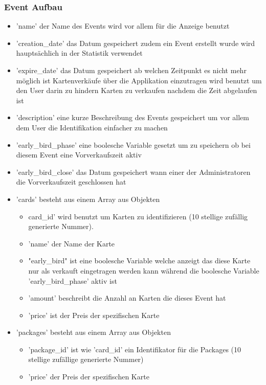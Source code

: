 			\subsubsection{Event Aufbau}			
				\begin{itemize}
					\item 'name' der Name des Events wird vor allem für die Anzeige benutzt
					\item 'creation\_date' das Datum gespeichert zudem ein Event erstellt wurde wird hauptsächlich in der Statistik verwendet
					\item 'expire\_date' das Datum gespeichert ab welchen Zeitpunkt es nicht mehr möglich ist Kartenverkäufe über die Applikation einzutragen wird benutzt um den User darin zu hindern Karten zu verkaufen nachdem die Zeit abgelaufen ist
					\item 'description' eine kurze Beschreibung des Events gespeichert um vor allem dem User die Identifikation einfacher zu machen
					\item 'early\_bird\_phase' eine boolesche Variable gesetzt um zu speichern ob bei diesem Event eine Vorverkaufszeit aktiv
					\item 'early\_bird\_close' das Datum gespeichert wann einer der Administratoren die Vorverkaufszeit geschlossen hat
					\item 'cards' besteht aus einem Array aus Objekten
					\begin{itemize}
						\item card\_id' wird benutzt um Karten zu identifizieren (10 stellige zufällig generierte Nummer). 
						\item 'name' der Name der Karte
						\item "early\_bird" ist eine boolesche Variable welche anzeigt das diese Karte nur als verkauft eingetragen werden kann während die boolesche Variable 'early\_bird\_phase' aktiv ist
						\item 'amount' beschreibt die Anzahl an Karten die dieses Event hat
						\item 'price' ist der Preis der spezifischen Karte
					\end{itemize}
					\item 'packages' besteht aus einem Array aus Objekten
					\begin{itemize}
						\item 'package\_id' ist wie 'card\_id' ein Identifikator für die Packages (10 stellige zufällige generierte Nummer)
						\item 'price' der Preis der spezifischen Karte

\end{itemize}
\end{itemize}
